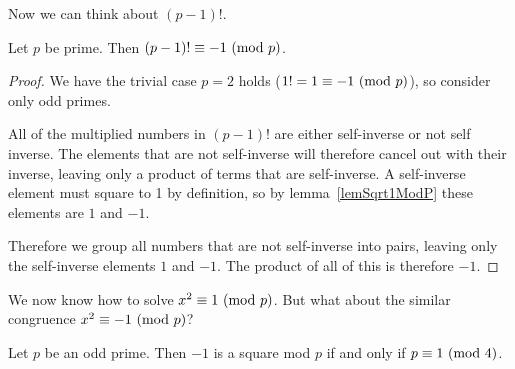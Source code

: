 \documentclass[../Main.tex]{subfiles}
\begin{document}
Now we can think about $(p-1)!$.
\begin{theorem}
    Let $p$ be prime. Then $(p-1)! \equiv -1~(\text{mod}~{p})$.
    \label{thmFactorialPMinusOne}
\end{theorem}
\begin{proof}
    We have the trivial case $p = 2$ holds ($1! = 1 \equiv -1~(\text{mod}~{p})$), so consider only odd primes.\par
    All of the multiplied numbers in $(p-1)!$ are either self-inverse or not self inverse. The elements that are not self-inverse will therefore cancel out with their inverse, leaving only a product of terms that are self-inverse. A self-inverse element must square to 1 by definition, so by lemma~\ref{lemSqrt1ModP} these elements are $1$ and $-1$.\par
    Therefore we group all numbers that are not self-inverse into pairs, leaving only the self-inverse elements $1$ and $-1$. The product of all of this is therefore $-1$.
\end{proof}
We now know how to solve $x^2 \equiv 1~(\text{mod}~{p})$. But what about the similar congruence $x^2 \equiv -1~(\text{mod}~{p})$?
\begin{proposition}
    Let $p$ be an odd prime. Then $-1$ is a square mod $p$ if and only if $p \equiv 1~(\text{mod}~{4})$.\label{propMinusOneModP}
\end{proposition}
\end{document}
